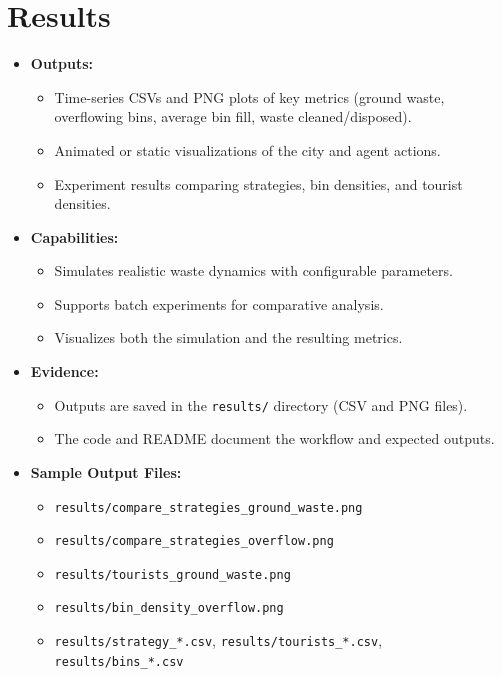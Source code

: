 \documentclass[12pt,a4paper]{article}
\begin{document}
\section*{Results}
\begin{itemize}
    \item \textbf{Outputs:}
    \begin{itemize}
        \item Time-series CSVs and PNG plots of key metrics (ground waste, overflowing bins, average bin fill, waste cleaned/disposed).
        \item Animated or static visualizations of the city and agent actions.
        \item Experiment results comparing strategies, bin densities, and tourist densities.
    \end{itemize}
    \item \textbf{Capabilities:}
    \begin{itemize}
        \item Simulates realistic waste dynamics with configurable parameters.
        \item Supports batch experiments for comparative analysis.
        \item Visualizes both the simulation and the resulting metrics.
    \end{itemize}
    \item \textbf{Evidence:}
    \begin{itemize}
        \item Outputs are saved in the \texttt{results/} directory (CSV and PNG files).
        \item The code and README document the workflow and expected outputs.
    \end{itemize}
    \item \textbf{Sample Output Files:}
    \begin{itemize}
        \item \texttt{results/compare_strategies_ground_waste.png}
        \item \texttt{results/compare_strategies_overflow.png}
        \item \texttt{results/tourists_ground_waste.png}
        \item \texttt{results/bin_density_overflow.png}
        \item \texttt{results/strategy\_*.csv}, \texttt{results/tourists\_*.csv}, \texttt{results/bins\_*.csv}
    \end{itemize}
\end{itemize}
\end{document}
